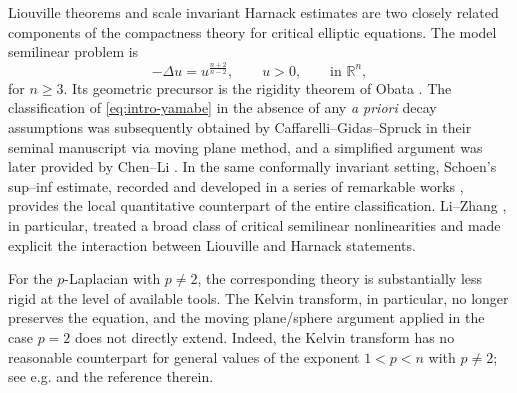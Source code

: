 \documentclass[reqno,12pt]{amsart}
\numberwithin{equation}{section}
\theoremstyle{remark}
\newcommand{\R}{\mathbb R}
\begin{document}
Liouville theorems and scale invariant Harnack estimates are two closely related components of the compactness theory for critical elliptic equations.
The model semilinear problem is
\begin{equation}\label{eq:intro-yamabe}
 -\Delta u=u^{\frac{n+2}{n-2}},\qquad u>0,\qquad \text{in }\R^n,
\end{equation}
for $n\ge3$.  Its geometric precursor is the rigidity theorem of Obata \cite{O1971}. The classification of \eqref{eq:intro-yamabe} in the absence of any \emph{a priori} decay assumptions was subsequently obtained by Caffarelli–Gidas–Spruck in their seminal manuscript \cite{CGS1989} via moving plane method, and a simplified argument  was later provided by Chen–Li \cite{CL1991}. In the same conformally invariant setting, Schoen's sup--inf estimate, 
recorded and developed in a series of remarkable works \cite{SZ1996,L1999,LZ2003}, provides the local quantitative counterpart of the entire classification. Li--Zhang \cite{LZ2003}, in particular, treated a broad class of critical semilinear nonlinearities and made 
explicit the interaction between Liouville and Harnack statements.

For the $p$-Laplacian with $p\ne2$, the corresponding theory is substantially less rigid at the level of available tools.  The Kelvin transform, in particular, no longer preserves the equation, and the moving plane/sphere argument applied in the case $p=2$ does not directly extend. Indeed, the Kelvin transform has no reasonable counterpart for general values of the exponent $1<p<n$ with $p\neq 2$; see e.g. \cite{L2016} and the reference therein.
\end{document}
